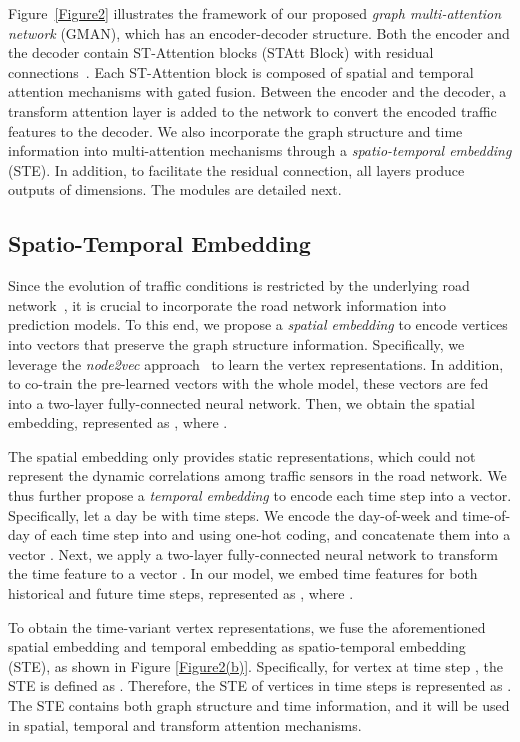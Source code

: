 \documentclass[letterpaper]{article} \usepackage{aaai20}  \usepackage{times}  \usepackage{helvet} \usepackage{courier}  \usepackage[hyphens]{url}  \usepackage{graphicx} \usepackage{amsmath}
\begin{document}
Figure~\ref{Figure2} illustrates the framework of our proposed \textit{graph multi-attention network} (GMAN), which has an encoder-decoder structure. Both the encoder and the decoder contain  ST-Attention blocks (STAtt Block) with residual connections~\cite{He-et-al:CVPR2016}. Each ST-Attention block is composed of spatial and temporal attention mechanisms with gated fusion. Between the encoder and the decoder, a transform attention layer is added to the network to convert the encoded traffic features to the decoder. We also incorporate the graph structure and time information into multi-attention mechanisms through a \textit{spatio-temporal embedding} (STE). In addition, to facilitate the residual connection, all layers produce outputs of  dimensions. The modules are detailed next.

\subsection{Spatio-Temporal Embedding}

Since the evolution of traffic conditions is restricted by the underlying road network~\cite{Lv-et-al:IJCAI2018}, it is crucial to incorporate the road network information into prediction models. To this end, we propose a \textit{spatial embedding} to encode vertices into vectors that preserve the graph structure information. Specifically, we leverage the \textit{node2vec} approach~\cite{Grover-and-Leskovec:KDD2016} to learn the vertex representations. In addition, to co-train the pre-learned vectors with the whole model, these vectors are fed into a two-layer fully-connected neural network. Then, we obtain the spatial embedding, represented as , where .

The spatial embedding only provides static representations, which could not represent the dynamic correlations among traffic sensors in the road network. We thus further propose a \textit{temporal embedding} to encode each time step into a vector. Specifically, let a day be with  time steps. We encode the day-of-week and time-of-day of each time step into  and  using one-hot coding, and concatenate them into a vector . Next, we apply a two-layer fully-connected neural network to transform the time feature to a vector . In our model, we embed time features for both historical  and future  time steps, represented as , where .

To obtain the time-variant vertex representations, we fuse the aforementioned spatial embedding and temporal embedding as spatio-temporal embedding (STE), as shown in Figure \ref{Figure2(b)}. Specifically, for vertex  at time step , the STE is defined as . Therefore, the STE of  vertices in  time steps is represented as . The STE contains both graph structure and time information, and it will be used in spatial, temporal and transform attention mechanisms. 
\end{document}
